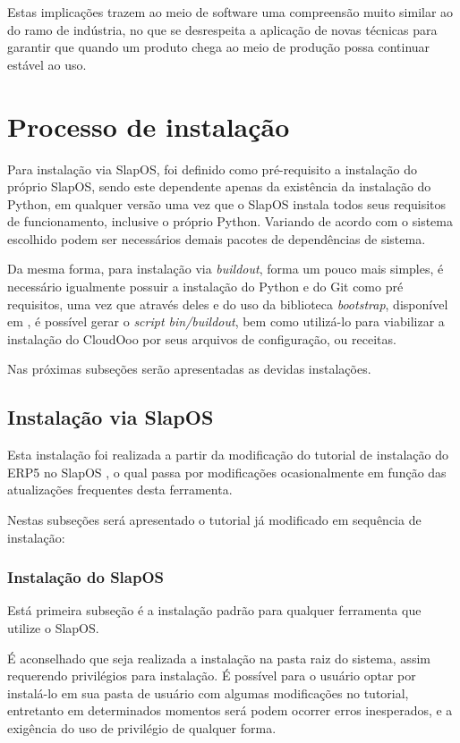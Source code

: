 Estas implicações trazem ao meio de software uma compreensão muito similar ao do ramo de indústria, no que se desrespeita a aplicação de novas técnicas para garantir que quando um produto chega ao meio de produção possa continuar estável ao uso.


\section{Processo de instalação}

Para instalação via SlapOS, foi definido como pré-requisito a instalação do próprio SlapOS, sendo este dependente apenas da existência da instalação do Python, em qualquer versão uma vez que o SlapOS instala todos seus requisitos de funcionamento, inclusive o próprio Python. Variando de acordo com o sistema escolhido podem ser necessários demais pacotes de dependências de sistema.

Da mesma forma, para instalação via \textit{buildout}, forma um pouco mais simples, é necessário igualmente possuir a instalação do  Python e do Git como pré requisitos, uma vez que através deles e do uso da biblioteca \textit{bootstrap}, disponível em \cite{BOOTSTRAP}, é possível gerar o \textit{script bin/buildout}, bem como utilizá-lo para viabilizar a instalação do CloudOoo por seus arquivos de configuração, ou receitas.

Nas próximas subseções serão apresentadas as devidas instalações.


\subsection{Instalação via SlapOS}

Esta instalação foi realizada a partir da modificação do tutorial de instalação do ERP5 no SlapOS \cite{ERP5-SLAPOS}, o qual passa por modificações ocasionalmente em função das atualizações frequentes desta ferramenta.

Nestas subseções será apresentado o tutorial já modificado em sequência de instalação:


\subsubsection{Instalação do SlapOS}
\label{insslapos}

Está primeira subseção é a instalação padrão para qualquer ferramenta que utilize o SlapOS.

É aconselhado que seja realizada a instalação na pasta raiz do sistema, assim requerendo privilégios para instalação. É possível para o usuário optar por instalá-lo em sua pasta de usuário com algumas modificações no tutorial, entretanto em determinados momentos será podem ocorrer erros inesperados, e a exigência do uso de privilégio de qualquer forma.

